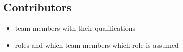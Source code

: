 \subsection{Contributors}

\begin{itemize}
    \item team members with their qualifications 
    \item roles and which team members which role is assumed
\end{itemize}


